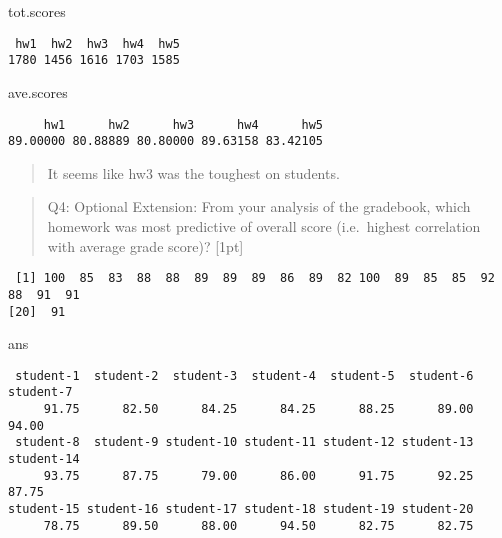 \documentclass[
  letterpaper,
  DIV=11,
  numbers=noendperiod]{scrartcl}
\newenvironment{Shaded}{\begin{snugshade}}{\end{snugshade}}
\newcommand{\NormalTok}[1]{\textcolor[rgb]{0.00,0.23,0.31}{#1}}
\newcommand{\SpecialCharTok}[1]{\textcolor[rgb]{0.37,0.37,0.37}{#1}}
\begin{document}
\begin{Shaded}
\begin{Highlighting}[]
\NormalTok{tot.scores}
\end{Highlighting}
\end{Shaded}

\begin{verbatim}
 hw1  hw2  hw3  hw4  hw5 
1780 1456 1616 1703 1585 
\end{verbatim}

\begin{Shaded}
\begin{Highlighting}[]
\NormalTok{ave.scores}
\end{Highlighting}
\end{Shaded}

\begin{verbatim}
     hw1      hw2      hw3      hw4      hw5 
89.00000 80.88889 80.80000 89.63158 83.42105 
\end{verbatim}

\begin{quote}
It seems like hw3 was the toughest on students.
\end{quote}

\begin{quote}
Q4: Optional Extension: From your analysis of the gradebook, which
homework was most predictive of overall score (i.e.~highest correlation
with average grade score)? {[}1pt{]}
\end{quote}

\begin{Shaded}
\end{Shaded}

\begin{verbatim}
 [1] 100  85  83  88  88  89  89  89  86  89  82 100  89  85  85  92  88  91  91
[20]  91
\end{verbatim}

\begin{Shaded}
\begin{Highlighting}[]
\NormalTok{ans}
\end{Highlighting}
\end{Shaded}

\begin{verbatim}
 student-1  student-2  student-3  student-4  student-5  student-6  student-7 
     91.75      82.50      84.25      84.25      88.25      89.00      94.00 
 student-8  student-9 student-10 student-11 student-12 student-13 student-14 
     93.75      87.75      79.00      86.00      91.75      92.25      87.75 
student-15 student-16 student-17 student-18 student-19 student-20 
     78.75      89.50      88.00      94.50      82.75      82.75 
\end{verbatim}
\end{document}
